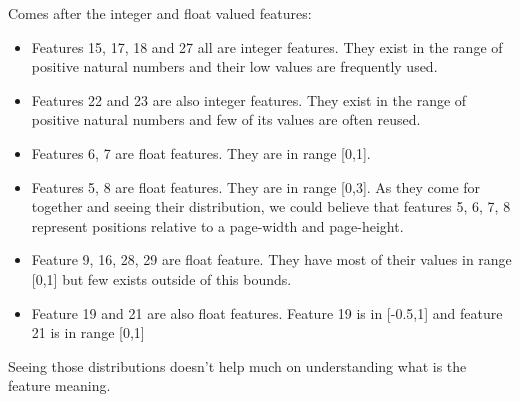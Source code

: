 		Comes after the integer and float valued features:
		\begin{itemize}
			\item Features 15, 17, 18 and 27 all are integer features. They exist in the range of positive natural numbers and their low values are frequently used.
			\item Features 22 and 23 are also integer features. They exist in the range of positive natural numbers and few of its values are often reused.
			\item Features 6, 7 are float features. They are in range [0,1].
			\item Features 5, 8 are float features. They are in range [0,3]. As they come for together and seeing their distribution, we could believe that features 5, 6, 7, 8 represent positions relative to a page-width and page-height.
			\item Feature 9, 16, 28, 29 are float feature. They have most of their values in range [0,1] but few exists outside of this bounds.
			\item Feature 19 and 21 are also float features. Feature 19 is in [-0.5,1] and feature 21 is in range [0,1]
		\end{itemize}
		
		Seeing those distributions doesn't help much on understanding what is the feature meaning.



